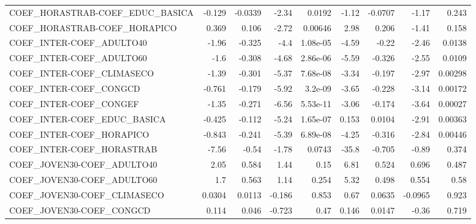 \begin{tabular}{lrrrrrrrr}
COEF\_HORASTRAB-COEF\_EDUC\_BASICA       &      -0.129 &      -0.0339 &   -2.34 &   0.0192 &      -1.12 &     -0.0707 &        -1.17 &         0.243 \\
COEF\_HORASTRAB-COEF\_HORAPICO          &       0.369 &        0.106 &   -2.72 &  0.00646 &       2.98 &       0.206 &        -1.41 &         0.158 \\
COEF\_INTER-COEF\_ADULTO40              &       -1.96 &       -0.325 &    -4.4 & 1.08e-05 &      -4.59 &       -0.22 &        -2.46 &        0.0138 \\
COEF\_INTER-COEF\_ADULTO60              &        -1.6 &       -0.308 &   -4.68 & 2.86e-06 &      -5.59 &      -0.326 &        -2.55 &        0.0109 \\
COEF\_INTER-COEF\_CLIMASECO             &       -1.39 &       -0.301 &   -5.37 & 7.68e-08 &      -3.34 &      -0.197 &        -2.97 &       0.00298 \\
COEF\_INTER-COEF\_CONGCD                &      -0.761 &       -0.179 &   -5.92 &  3.2e-09 &      -3.65 &      -0.228 &        -3.14 &       0.00172 \\
COEF\_INTER-COEF\_CONGEF                &       -1.35 &       -0.271 &   -6.56 & 5.53e-11 &      -3.06 &      -0.174 &        -3.64 &       0.00027 \\
COEF\_INTER-COEF\_EDUC\_BASICA           &      -0.425 &       -0.112 &   -5.24 & 1.65e-07 &      0.153 &      0.0104 &        -2.91 &       0.00363 \\
COEF\_INTER-COEF\_HORAPICO              &      -0.843 &       -0.241 &   -5.39 & 6.89e-08 &      -4.25 &      -0.316 &        -2.84 &       0.00446 \\
COEF\_INTER-COEF\_HORASTRAB             &       -7.56 &        -0.54 &   -1.78 &   0.0743 &      -35.8 &      -0.705 &        -0.89 &         0.374 \\
COEF\_JOVEN30-COEF\_ADULTO40            &        2.05 &        0.584 &    1.44 &     0.15 &       6.81 &       0.524 &        0.696 &         0.487 \\
COEF\_JOVEN30-COEF\_ADULTO60            &         1.7 &        0.563 &    1.14 &    0.254 &       5.32 &       0.498 &        0.554 &          0.58 \\
COEF\_JOVEN30-COEF\_CLIMASECO           &      0.0304 &       0.0113 &  -0.186 &    0.853 &       0.67 &      0.0635 &      -0.0965 &         0.923 \\
COEF\_JOVEN30-COEF\_CONGCD              &       0.114 &        0.046 &  -0.723 &     0.47 &      0.146 &      0.0147 &        -0.36 &         0.719 \\

\end{tabular}
